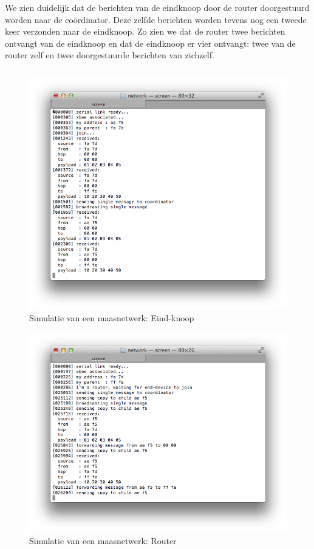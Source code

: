 We zien duidelijk dat de berichten van de eindknoop door de router doorgestuurd
worden naar de co\"ordinator. Deze zelfde berichten worden tevens nog een tweede
keer verzonden naar de eindknoop. Zo zien we dat de router twee berichten
ontvangt van de eindknoop en dat de eindknoop er vier ontvangt: twee van de
router zelf en twee doorgestuurde berichten van zichzelf.

\inputminted[linenos,frame=lines,framesep=2mm,fontsize=\footnotesize,firstline=37,lastline=60,firstnumber=37]{c}{../src/demo/lib/network.c}
\vspace{-5mm}
\vspace{3mm}

\begin{figure}[ht]
  \centering
  \includegraphics[width=.7\linewidth]{../src/demo/network/end-device.png}
  \vspace{-3mm}
  \caption{Simulatie van een maasnetwerk: Eind-knoop}
  \label{fig:virtual-mesh-end-device}
\end{figure}

\begin{figure}[ht]
  \centering
  \includegraphics[width=.7\linewidth]{../src/demo/network/router.png}
  \vspace{-3mm}
  \caption{Simulatie van een maasnetwerk: Router}
  \label{fig:virtual-mesh-router}
\end{figure}

